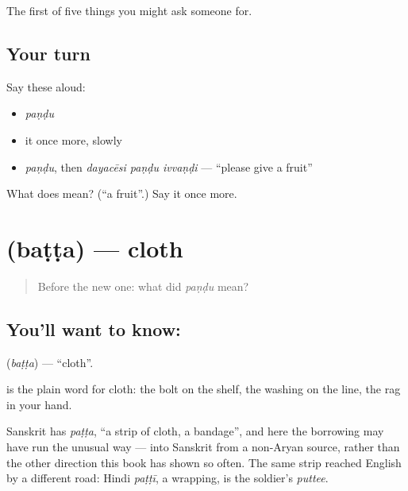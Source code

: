 \begin{grammarlens}[title={What you've built}]
The first of five things you might ask someone for.
\end{grammarlens}

\subsection*{Your turn}
Say these aloud:

\begin{itemize}
\raggedright
  \item \emph{paṇḍu}
  \item it once more, slowly
  \item \emph{paṇḍu}, then \emph{dayacēsi paṇḍu ivvaṇḍi} — \textquotedblleft{}please give a fruit\textquotedblright{}
\end{itemize}

\begin{tcolorbox}[breakable,colback=teal!4,colframe=teal!35!black,title={Before you move on}]
What does  mean? (\textquotedblleft{}a fruit\textquotedblright{}.) Say it once more.
\end{tcolorbox}
\section[\texorpdfstring{\te{బట్ట} (baṭṭa)}{బట్ట (baṭṭa)}]{ (baṭṭa) — cloth}

\label{lesson:TE-C46-cloth}



\begin{quote}
Before the new one: what did \emph{paṇḍu} mean?
\end{quote}

\subsection*{You'll want to know: }
\textbf{} (\emph{baṭṭa}) — \textquotedblleft{}cloth\textquotedblright{}.

 is the plain word for cloth: the bolt on the shelf, the washing on the line, the rag in your hand.

Sanskrit has \emph{paṭṭa}, \textquotedblleft{}a strip of cloth, a bandage\textquotedblright{}, and here the borrowing may have run the unusual way — into Sanskrit from a non-Aryan source, rather than the other direction this book has shown so often. The same strip reached English by a different road: Hindi \emph{paṭṭī}, a wrapping, is the soldier's \emph{puttee}.

